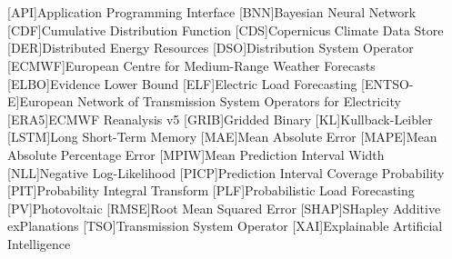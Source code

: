 \documentclass[Master,english,IEEE]{twbook}
\begin{document}
\listoffigures
\clearpage

\listoftables
\clearpage

\listaitools
\clearpage

{}
\chapter*{\listacroname}
\begin{acronym}[ENTSO-E]
    [API]{Application Programming Interface}
    [BNN]{Bayesian Neural Network}
    [CDF]{Cumulative Distribution Function}
    [CDS]{Copernicus Climate Data Store}
    [DER]{Distributed Energy Resources}
    [DSO]{Distribution System Operator}
    [ECMWF]{European Centre for Medium-Range Weather Forecasts}
    [ELBO]{Evidence Lower Bound}
    [ELF]{Electric Load Forecasting}
    [ENTSO-E]{European Network of Transmission System Operators for Electricity}
    [ERA5]{ECMWF Reanalysis v5}
    [GRIB]{Gridded Binary}
    [KL]{Kullback-Leibler}
    [LSTM]{Long Short-Term Memory}
    [MAE]{Mean Absolute Error}
    [MAPE]{Mean Absolute Percentage Error}
    [MPIW]{Mean Prediction Interval Width}
    [NLL]{Negative Log-Likelihood}
    [PICP]{Prediction Interval Coverage Probability}
    [PIT]{Probability Integral Transform}
    [PLF]{Probabilistic Load Forecasting}
    [PV]{Photovoltaic}
    [RMSE]{Root Mean Squared Error}
    [SHAP]{SHapley Additive exPlanations}
    [TSO]{Transmission System Operator}
    [XAI]{Explainable Artificial Intelligence}
\end{acronym}


%
%
\end{document}
